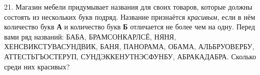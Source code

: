 21. Магазин мебели придумывает названия для своих товаров, которые должны состоять из нескольких букв подряд. Название признаётся {\it красивым,} если в нём количество букв {\bf А} и количество букв {\bf Б} отличается не более чем на одну. Перед вами ряд названий: БАБА, БРАМСОНКАРЛСЁ, НЯНЯ, ХЕНСВИКСТУВАСУНДВИК, БАНЯ, ПАНОРАМА, ОБАМА, АЛЬБРУОВЕРБУ, АТТЕСТЬТЪОСТЕРУП, СУНДЭККЕНУТНЭСФУНБУ, АБРАКАДАБРА. Сколько среди них красивых?\\
